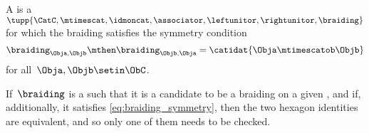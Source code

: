 \begin{ctdefinition}
    \label{def:sym-mon-cat}
    A  is a  $\tupp{\CatC, \mtimescat, \idmoncat, \associator, \leftunitor, \rightunitor, \braiding}$ for which the braiding satisfies the symmetry condition
    \begin{equation}
        \label{eq:braiding-symmetry}
        \braiding_{\Obja,\Objb} \mthen \braiding_{\Objb,\Obja} = \catidat{\Obja \mtimescatob \Objb}
    \end{equation}
    for all~$\Obja, \Objb \setin \ObC$.
\end{ctdefinition}

\begin{remark}
    If~$\braiding$ is a  such that it is a candidate to be a braiding on a given , and if, additionally, it satisfies \cref{eq:braiding_symmetry}, then the two hexagon identities are equivalent, and so only one of them needs to be checked.
\end{remark}
